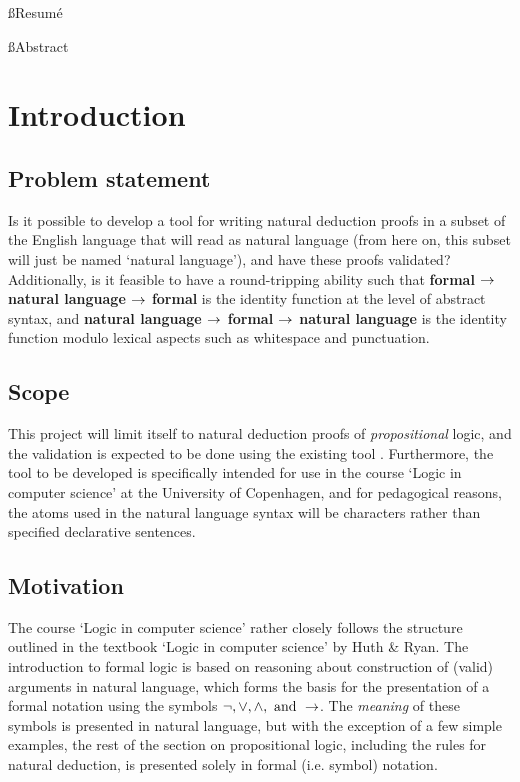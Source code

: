 \documentclass[a4paper]{article}
\title{\tit}
\begin{document}
\begin{titlepage}
\maketitle
\thispagestyle{empty}
\end{titlepage}

\tableofcontents
\thispagestyle{empty}
\pagebreak
{}

\ss{Resumé}

\ss{Abstract}

\section{Introduction}
\subsection{Problem statement}
    Is it possible to develop a tool for writing natural deduction proofs
    in a subset of the English language that will read as natural language
    (from here on, this subset will just be named `natural language'),
    and have these proofs validated? Additionally, is it feasible to have
    a round-tripping ability such that {\bf formal $\rightarrow$ natural language
    $\rightarrow$ formal} is the identity function at the level of abstract syntax,
    and {\bf natural language $\rightarrow$ formal $\rightarrow$ natural language} is the
    identity function modulo lexical aspects such as whitespace and
    punctuation.

\subsection{Scope}
    This project will limit itself to natural deduction proofs of
    \emph{propositional} logic, and the validation is expected to be done
    using the existing tool \cite{box}. Furthermore, the tool
    to be developed is specifically intended for use in the course `Logic
    in computer science' at the University of Copenhagen, and for  
    pedagogical reasons, the atoms used in the natural language syntax
    will be characters rather than specified declarative sentences.

\subsection{Motivation}
    The course `Logic in computer science' rather closely follows the 
    structure outlined in the textbook `Logic in computer science' by
    Huth \& Ryan\cite{hr}. The introduction to formal logic is based on
    reasoning about construction of (valid) arguments in natural 
    language\cite[pp.~1-2]{hr}, which forms the basis for the presentation
    of a formal notation using the symbols 
    \(\neg, \lor, \land, \textnormal{ and } \rightarrow\)\cite[p.~4]{hr}. 
    The \emph{meaning} of these symbols is presented in natural language,
    but with the exception of a few simple examples, the rest of the section 
    on propositional logic, including the rules for natural deduction,
    is presented solely in formal (i.e. symbol) notation.
\end{document}
